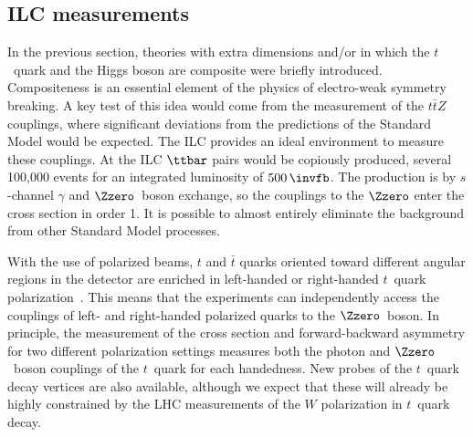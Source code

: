 \subsection{ILC measurements}

In the previous section, theories with extra dimensions and/or in which the 
$t$~quark and the Higgs boson are composite were briefly introduced. Compositeness is an
essential element of the physics of electro-weak symmetry breaking.
A key test of this idea would come from the measurement of the $t\bar
t Z$ couplings, where significant deviations from the predictions of
the Standard Model would be expected. The ILC provides an ideal environment to measure these couplings. 
At the ILC $\ttbar$ pairs would be copiously produced, several 100,000 events 
for an integrated luminosity of $500\,\invfb$.  The production is by
$s$-channel $\gamma$ and $\Zzero$~boson exchange, so the couplings to the $\Zzero$ enter the
cross section in order 1.  It is possible  to almost entirely eliminate the background from other Standard Model processes.  

With the use of polarized beams, $t$ and $\bar t$ quarks oriented
toward different angular regions in the detector are enriched 
in left-handed or right-handed $t$~quark
polarization~\cite{Parke:1996pr}. 
This means that the experiments can independently access the 
couplings of left- and right-handed polarized quarks to the $\Zzero$~boson.
In principle, the measurement of the  cross section and forward-backward
asymmetry for two different polarization settings measures both the
photon and $\Zzero$~boson couplings of the $t$~quark for each handedness.
New probes of the $t$~quark  decay vertices are also available, although we expect that
these will already be highly constrained by the LHC measurements of
the $W$ polarization in $t$~quark decay.

